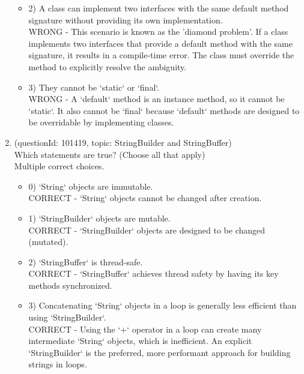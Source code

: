 \documentclass[12pt]{article}
\begin{document}
\begin{enumerate}[label=(\arabic*)]
\begin{itemize}
\item 2) A class can implement two interfaces with the same default method signature without providing its own implementation.
 \\ 
WRONG - This scenario is known as the 'diamond problem'. If a class implements two interfaces that provide a default method with the same signature, it results in a compile-time error. The class must override the method to explicitly resolve the ambiguity.

\item 3) They cannot be `static` or `final`.
 \\ 
WRONG - A `default` method is an instance method, so it cannot be `static`. It also cannot be `final` because `default` methods are designed to be overridable by implementing classes.

\end{itemize}
\item (questionId: 101419, topic: StringBuilder and StringBuffer) \\ 
Which statements are true? (Choose all that apply)
\\ \noindent Multiple correct choices. 
\begin{itemize}
\item 0) `String` objects are immutable.
 \\ 
CORRECT - `String` objects cannot be changed after creation.

\item 1) `StringBuilder` objects are mutable.
 \\ 
CORRECT - `StringBuilder` objects are designed to be changed (mutated).

\item 2) `StringBuffer` is thread-safe.
 \\ 
CORRECT - `StringBuffer` achieves thread safety by having its key methods synchronized.

\item 3) Concatenating `String` objects in a loop is generally less efficient than using `StringBuilder`.
 \\ 
CORRECT - Using the `+` operator in a loop can create many intermediate `String` objects, which is inefficient. An explicit `StringBuilder` is the preferred, more performant approach for building strings in loops.


\end{itemize}
\end{enumerate}
\end{document}
